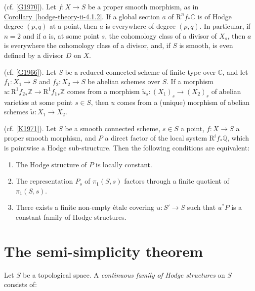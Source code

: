     \label{hodge-theory-ii-4.1.3.1}\par{}(cf. [\hyperref[G1970]{G1970}]).
        Let \(f\colon  X\to  S\) be a proper smooth morphism, as in \hyperref[hodge-theory-ii-4.1.2]{Corollary~\ref*{hodge-theory-ii-4.1.2}}.
        If a global section \(a\) of \(\mathrm {R}^n f_*\mathbb {C}\) is of Hodge degree \((p,q)\) at a point, then \(a\) is everywhere of degree \((p,q)\).
        In particular, if \(n=2\) and if \(a\) is, at some point \(s\), the cohomology class of a divisor of \(X_s\), then \(a\) is everywhere the cohomology class of a divisor, and, if \(S\) is smooth, is even defined by a divisor \(D\) on \(X\).

    \label{hodge-theory-ii-4.1.3.2}\par{}(cf. [\hyperref[G1966]{G1966}]).
        Let \(S\) be a reduced connected scheme of finite type over \(\mathbb {C}\), and let \(f_1\colon  X_1\to  S\) and \(f_2\colon  X_2\to  S\) be abelian schemes over \(S\).
        If a morphism \(u\colon \mathrm {R}^1{f_2}_*\mathbb {Z}\to \mathrm {R}^1{f_1}_*\mathbb {Z}\) comes from a morphism \(\widetilde {u}_s\colon (X_1)_s\to (X_2)_s\) of abelian varieties at some point \(s\in  S\), then \(u\) comes from a (unique) morphism of abelian schemes \(\widetilde {u}\colon  X_1\to  X_2\).

    \label{hodge-theory-ii-4.1.3.3}\par{}(cf. [\hyperref[K1971]{K1971}]).
        Let \(S\) be a smooth connected scheme, \(s\in  S\) a point, \(f\colon  X\to  S\) a proper smooth morphism, and \(P\) a direct factor of the local system \(\mathrm {R}^i f_*\mathbb {Q}\), which is pointwise a Hodge sub-structure.
        Then the following conditions are equivalent:

        
 \begin{enumerate}
          
 \item[(a)]
            The Hodge structure of \(P\) is locally constant.
          

          
 \item[(b)]
            The representation \(P_s\) of \(\pi _1(S,s)\) factors through a finite quotient of \(\pi _1(S,s)\).
          

          
 \item[(c)]
            There exists a finite non-empty étale covering \(u\colon  S'\to  S\) such that \(u^*P\) is a constant family of Hodge structures.
          

        \end{enumerate}\section{The semi-simplicity theorem}\label{hodge-theory-ii-4.2}\label{hodge-theory-ii-4.2.1}\par{}Let \(S\) be a topological space.
    A \emph{continuous family of Hodge structures} on \(S\) consists of:


